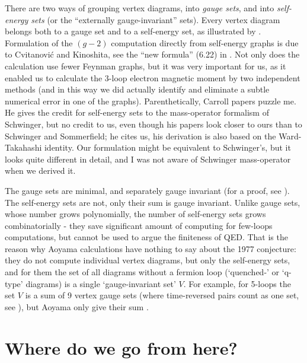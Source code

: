 There are two ways of grouping vertex diagrams, into \emph{gauge sets},
and into \emph{self-energy sets} (or the ``externally gauge-invariant''
sets). Every vertex diagram belongs both to a gauge set and to a
self-energy set, as illustrated by .
Formulation of the $(g-2)$ computation directly from self-energy graphs
is due to
{Cvitanovi\'{c} and Kinoshita}, see the ``new formula'' (6.22) in
. Not only does
the calculation use fewer Feynman graphs, but it was very important for
us, as it enabled us to calculate the 3-loop electron magnetic moment by
two independent methods (and in this way we did actually identify and
eliminate a subtle numerical error in one of the graphs).
Parenthetically, Carroll papers puzzle me. He
gives the credit for self-energy sets to the mass-operator formalism of
Schwinger, but no credit to
us, even though his papers look closer to ours than to
Schwinger and Sommerfield; he cites us, his derivation is also based on
the Ward-Takahashi identity. Our formulation might be equivalent to
Schwinger's, but it looks quite different in detail, and I was not aware
of Schwinger mass-operator when we derived it.

The gauge sets are minimal, and separately gauge invariant (for a proof,
see ). The self-energy sets are not, only their sum is
gauge invariant.
Unlike gauge sets, whose number grows polynomially, the number of
self-energy sets grows combinatorially - they save significant amount
of computing for few-loops computations, but cannot be used to argue the
finiteness of QED.
That is the reason why Aoyama \etal{}
calculations have nothing to say about the 1977 conjecture:
they do not compute individual vertex diagrams, but only the self-energy
sets, and for them the set of all diagrams without a fermion loop
(`quenched-' or `q-type' diagrams) is a single `gauge-invariant set'
$V$. For example, for 5-loops the set $V$ is a sum of 9 vertex gauge sets
(where time-reversed pairs count as one set, see ),
but Aoyama \etal{} only give their sum .

\section{Where do we go from here?}
\label{sect:future}

